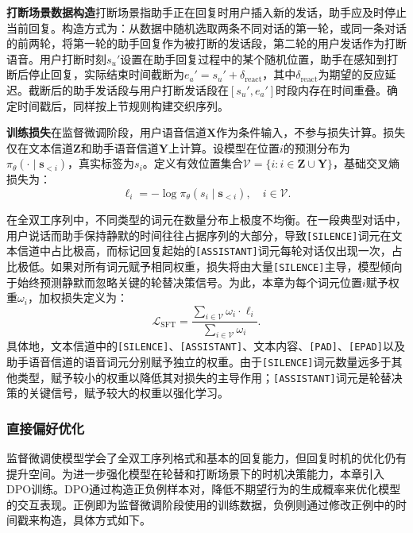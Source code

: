 \textbf{打断场景数据构造}\quad 打断场景指助手正在回复时用户插入新的发话，助手应及时停止当前回复。构造方式为：从数据中随机选取两条不同对话的第一轮，或同一条对话的前两轮，将第一轮的助手回复作为被打断的发话段，第二轮的用户发话作为打断语音。用户打断时刻$s_u'$设置在助手回复过程中的某个随机位置，助手在感知到打断后停止回复，实际结束时间截断为$e_a' = s_u' + \delta_{\text{react}}$，其中$\delta_{\text{react}}$为期望的反应延迟。截断后的助手发话段与用户打断发话段在$[s_u', e_a']$时段内存在时间重叠。确定时间戳后，同样按上节规则构建交织序列。

\textbf{训练损失}\quad 在监督微调阶段，用户语音信道$\mathbf{X}$作为条件输入，不参与损失计算。损失仅在文本信道$\mathbf{Z}$和助手语音信道$\mathbf{Y}$上计算。设模型在位置$i$的预测分布为$\pi_\theta(\cdot \mid \mathbf{s}_{<i})$，真实标签为$s_i$。定义有效位置集合$\mathcal{V} = \{i : i \in \mathbf{Z} \cup \mathbf{Y}\}$，基础交叉熵损失为：
\begin{equation}
    \ell_i = -\log \pi_\theta(s_i \mid \mathbf{s}_{<i}), \quad i \in \mathcal{V}.
\end{equation}

在全双工序列中，不同类型的词元在数量分布上极度不均衡。在一段典型对话中，用户说话而助手保持静默的时间往往占据序列的大部分，导致\texttt{[SILENCE]}词元在文本信道中占比极高，而标记回复起始的\texttt{[ASSISTANT]}词元每轮对话仅出现一次，占比极低。如果对所有词元赋予相同权重，损失将由大量\texttt{[SILENCE]}主导，模型倾向于始终预测静默而忽略关键的轮替决策信号。为此，本章为每个词元位置$i$赋予权重$\omega_i$，加权损失定义为：
\begin{equation}
    \mathcal{L}_{\text{SFT}} = \frac{\sum_{i \in \mathcal{V}} \omega_i \cdot \ell_i}{\sum_{i \in \mathcal{V}} \omega_i}.
\end{equation}
具体地，文本信道中的\texttt{[SILENCE]}、\texttt{[ASSISTANT]}、文本内容、\texttt{[PAD]}、\texttt{[EPAD]}以及助手语音信道的语音词元分别赋予独立的权重。由于\texttt{[SILENCE]}词元数量远多于其他类型，赋予较小的权重以降低其对损失的主导作用；\texttt{[ASSISTANT]}词元是轮替决策的关键信号，赋予较大的权重以强化学习。

\subsubsection{直接偏好优化}

监督微调使模型学会了全双工序列格式和基本的回复能力，但回复时机的优化仍有提升空间。为进一步强化模型在轮替和打断场景下的时机决策能力，本章引入DPO\citep{rafailov2023dpo}训练。DPO通过构造正负例样本对，降低不期望行为的生成概率来优化模型的交互表现。正例即为监督微调阶段使用的训练数据，负例则通过修改正例中的时间戳来构造，具体方式如下。

